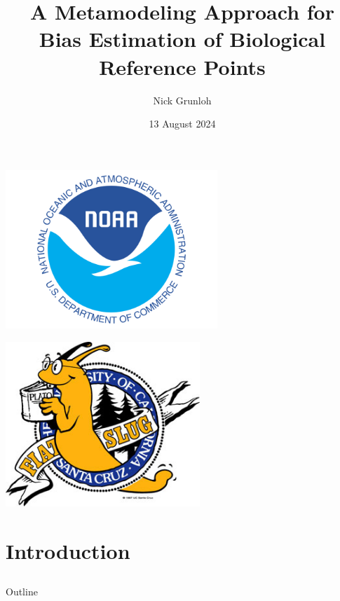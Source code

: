 \documentclass[ xcolor = pdftex, dvipsnames, table ]{beamer}
\title{A Metamodeling Approach for Bias Estimation of Biological Reference Points}
\author{
Nick Grunloh
}
\date{13 August 2024}
\begin{document}
%
\begin{frame}
\titlepage
\vspace*{-3cm}
\begin{minipage}[h!]{0.49\textwidth}
\hspace*{-0.25cm}
\includegraphics[width=0.6\textwidth]{noaaText.png}
\end{minipage}
\begin{minipage}[h!]{0.49\textwidth}
\hspace*{2cm}
\includegraphics[width=0.55\textwidth]{slug.jpg}
\end{minipage}
\end{frame}


%
\section{Introduction}
\subsection{}
\begin{frame}{Outline}
\end{frame}
\end{document}
